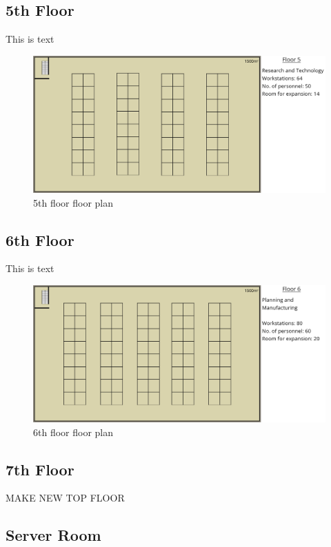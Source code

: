 \subsection{5th Floor}
This is text
\begin{figure}[h]
    \includegraphics[width=15cm]{Figures/5th-Floor.png}
    \caption{5th floor floor plan}
    \label{5th_floor}
\end{figure}
\subsection{6th Floor}
This is text
\begin{figure}[h]
    \includegraphics[width=15cm]{Figures/6th-Floor.png}
    \caption{6th floor floor plan}
    \label{6th_floor}
\end{figure}
\subsection{7th Floor}
\begin{huge}
    MAKE NEW TOP FLOOR
\end{huge}
\subsection{Server Room}